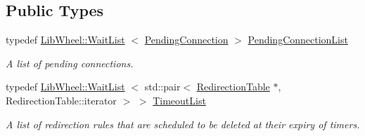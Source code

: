 \subsection*{\-Public \-Types}
\begin{DoxyCompactItemize}
\item 
typedef \hyperlink{classLibWheel_1_1WaitList}{\-Lib\-Wheel\-::\-Wait\-List}\*
$<$ \hyperlink{structNERD_1_1ConnectionServer_1_1PendingConnection}{\-Pending\-Connection} $>$ \hyperlink{classNERD_1_1ConnectionServer_ac838d247f33cef856ae722343a8cb7ff}{\-Pending\-Connection\-List}
\begin{DoxyCompactList}\small\item\em \-A list of pending connections. \end{DoxyCompactList}\item 
typedef \hyperlink{classLibWheel_1_1WaitList}{\-Lib\-Wheel\-::\-Wait\-List}\*
$<$ std\-::pair$<$ \hyperlink{classNERD_1_1ConnectionServer_a1f7b6abdda0f0a7a027a5f2e24727cee}{\-Redirection\-Table} \*
$\ast$, \-Redirection\-Table\-::iterator $>$ $>$ \hyperlink{classNERD_1_1ConnectionServer_a63d211040487b4566f2f696026723932}{\-Timeout\-List}
\begin{DoxyCompactList}\small\item\em \-A list of redirection rules that are scheduled to be deleted at their expiry of timers. \end{DoxyCompactList}\end{DoxyCompactItemize}
